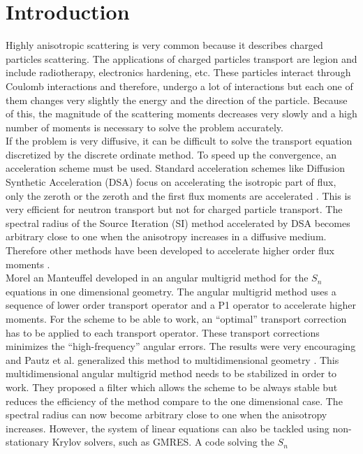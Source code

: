 \section{Introduction}
Highly anisotropic scattering is very common because it describes charged
particles scattering. The applications of charged particles transport are
legion and include radiotherapy, electronics hardening, etc. These particles 
interact through Coulomb interactions and therefore, undergo a lot of interactions 
but each one of them changes very slightly the energy and the direction of the 
particle. Because of this, the magnitude of the scattering moments decreases 
very slowly and a high number of moments is necessary to solve the problem 
accurately.\\
If the problem is very diffusive, it can be difficult to solve the transport
equation discretized by the discrete ordinate method. To speed up the
convergence, an acceleration scheme must be used. Standard acceleration schemes 
like Diffusion Synthetic Acceleration (DSA) focus on accelerating the isotropic 
part of flux, only the zeroth or the zeroth and the first flux 
moments are accelerated \cite{adams}. This is very efficient for neutron transport 
but not for charged particle transport. The spectral radius of the Source
Iteration (SI) method accelerated by DSA becomes arbitrary close to one when the 
anisotropy increases in a diffusive medium. Therefore other methods have been 
developed to accelerate higher order flux moments 
\cite{kassem,multigrid_1d,multigrid_2d}.\\
Morel an Manteuffel developed in \cite{multigrid_1d} an angular multigrid
method for the $S_n$ equations in one dimensional geometry. The angular
multigrid method uses a sequence of lower order transport operator and a
P1 operator to accelerate higher moments. For the scheme to be able to
work, an ``optimal'' transport correction has to be applied to each transport
operator. These transport corrections minimizes the ``high-frequency'' angular
errors. The results were very encouraging and Pautz et al. generalized this method 
to multidimensional geometry \cite{multigrid_2d}. This multidimensional
angular multigrid method needs to be stabilized in order to work. They proposed a 
filter which allows the scheme to be always stable but reduces the 
efficiency of the method compare to the one dimensional case. The spectral 
radius can now become arbitrary close to one when the anisotropy increases.
However, the system of linear equations can also be tackled using
non-stationary Krylov solvers, such as GMRES. A code solving the $S_n$
